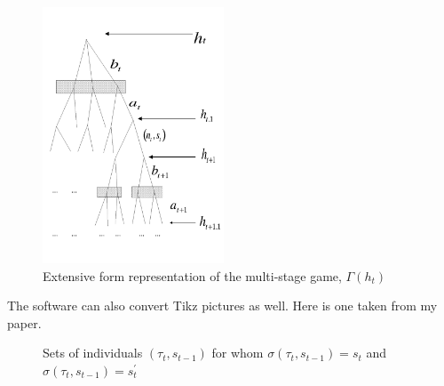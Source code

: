 \documentclass[12pt,svgnames]{article}
\begin{document}
\begin{figure}[htbp]
\begin{center}
\includegraphics[height=3.0in,keepaspectratio=true]{tree1.png}
\end{center}
\caption{Extensive form representation of the multi-stage game, $\Gamma(h_t)$}
\label{fig1}
\end{figure}

The software can also convert Tikz pictures as well.  Here is one taken from my \cite{Raut_2017a} paper.

\begin{figure}[tbp]
\begin{center}
\end{center}
\caption{Sets of individuals $(\tau_t,s_{t-1})$ for whom $\sigma(\tau_t,s_{t-1})=s_t$ and $\sigma(\tau _t,s_{t-1})=s^{\prime }_t$}
\label{fig2}
\end{figure}
\end{document}
